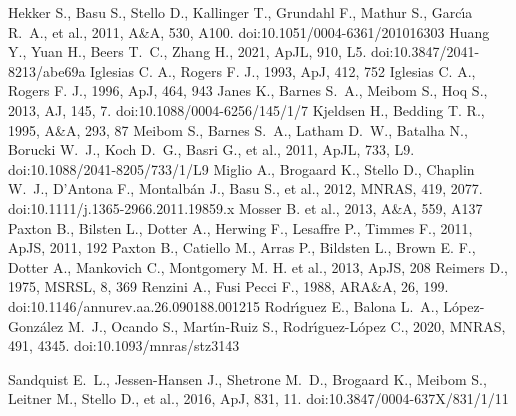 \documentclass[a4paper,fleqn,usenatbib]{mnras}     %
\begin{document}
{\begin{thebibliography}{99}
 Hekker S., Basu S., Stello D., Kallinger T., Grundahl F., Mathur S., Garc{\'\i}a R.~A., et al., 2011, A\&A, 530, A100. doi:10.1051/0004-6361/201016303
 Huang Y., Yuan H., Beers T.~C., Zhang H., 2021, ApJL, 910, L5. doi:10.3847/2041-8213/abe69a
 Iglesias C. A., Rogers F. J., 1993, ApJ, 412, 752
 Iglesias C. A., Rogers F. J., 1996, ApJ, 464, 943
 Janes K., Barnes S.~A., Meibom S., Hoq S., 2013, AJ, 145, 7. doi:10.1088/0004-6256/145/1/7
 Kjeldsen H., Bedding T. R., 1995, A\&A, 293, 87
 Meibom S., Barnes S.~A., Latham D.~W., Batalha N., Borucki W.~J., Koch D.~G., Basri G., et al., 2011, ApJL, 733, L9. doi:10.1088/2041-8205/733/1/L9
 Miglio A., Brogaard K., Stello D., Chaplin W.~J., D'Antona F., Montalb{\'a}n J., Basu S., et al., 2012, MNRAS, 419, 2077. doi:10.1111/j.1365-2966.2011.19859.x
Mosser B. et al., 2013, A\&A, 559, A137
 Paxton B., Bilsten L., Dotter A., Herwing F., Lesaffre P., Timmes F., 2011, ApJS, 2011, 192
 Paxton B., Catiello M., Arras P., Bildsten L., Brown E. F., Dotter A., Mankovich C., Montgomery M. H. et al., 2013, ApJS, 208
 Reimers D., 1975, MSRSL, 8, 369
 Renzini A., Fusi Pecci F., 1988, ARA\&A, 26, 199. doi:10.1146/annurev.aa.26.090188.001215
 Rodr{\'\i}guez E., Balona L.~A., L{\'o}pez-Gonz{\'a}lez M.~J., Ocando S., Mart{\'\i}n-Ruiz S., Rodr{\'\i}guez-L{\'o}pez C., 2020, MNRAS, 491, 4345. doi:10.1093/mnras/stz3143

 Sandquist E.~L., Jessen-Hansen J., Shetrone M.~D., Brogaard K., Meibom S., Leitner M., Stello D., et al., 2016, ApJ, 831, 11. doi:10.3847/0004-637X/831/1/11


\end{thebibliography}}
\end{document}
